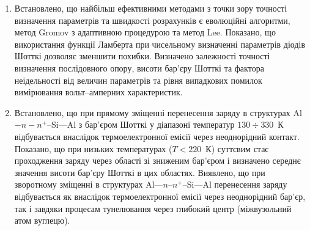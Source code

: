 \begin{enumerate}[leftmargin=0cm,itemindent=3em]
   \item Встановлено, що найбільш ефективними методами з точки зору точності визначення параметрів та швидкості розрахунків є еволюційні алгоритми, метод Gromov з адаптивною процедурою та метод Lee.
    Показано, що використання функції Ламберта при чисельному визначенні параметрів діодів Шотткі дозволяє зменшити похибки.
    Визначено залежності точності визначення послідовного опору, висоти бар'єру Шотткі та фактора неідельності від величин параметрів та рівня випадкових помилок вимірювання вольт--амперних характеристик.

   \item
Встановлено, що при прямому зміщенні перенесення заряду в структурах Al$-n-n^+$--Si---Al з бар'єром Шотткі у діапазоні температур $130\div330$~К відбувається внаслідок термоелектронної емісії через неоднорідний контакт.
        Показано, що при низьких температурах ($T<220$~К) суттєвим стає проходження заряду через області зі зниженим бар'єром і визначено середнє значення висоти бар'єру Шотткі в цих областях.
     Виявлено, що при зворотному зміщенні в структурах Al---$n$--$n^+$--Si---Al перенесення заряду відбувається як внаслідок термоелектронної емісії через неоднорідний бар'єр, так і завдяки процесам тунелювання через глибокий центр (міжвузольний атом вуглецю).


\end{enumerate}
